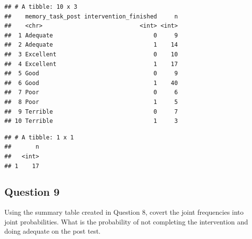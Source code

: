 \documentclass[]{book}
\newenvironment{Shaded}{\begin{snugshade}}{\end{snugshade}}
\newcommand{\CommentTok}[1]{\textcolor[rgb]{0.56,0.35,0.01}{\textit{#1}}}
\newcommand{\DecValTok}[1]{\textcolor[rgb]{0.00,0.00,0.81}{#1}}
\newcommand{\FloatTok}[1]{\textcolor[rgb]{0.00,0.00,0.81}{#1}}
\newcommand{\KeywordTok}[1]{\textcolor[rgb]{0.13,0.29,0.53}{\textbf{#1}}}
\newcommand{\NormalTok}[1]{#1}
\newcommand{\OperatorTok}[1]{\textcolor[rgb]{0.81,0.36,0.00}{\textbf{#1}}}
\newcommand{\StringTok}[1]{\textcolor[rgb]{0.31,0.60,0.02}{#1}}
\theoremstyle{definition}
\theoremstyle{definition}
\theoremstyle{definition}
\theoremstyle{remark}
\begin{document}
\begin{verbatim}
## # A tibble: 10 x 3
##    memory_task_post intervention_finished     n
##    <chr>                            <int> <int>
##  1 Adequate                             0     9
##  2 Adequate                             1    14
##  3 Excellent                            0    10
##  4 Excellent                            1    17
##  5 Good                                 0     9
##  6 Good                                 1    40
##  7 Poor                                 0     6
##  8 Poor                                 1     5
##  9 Terrible                             0     7
## 10 Terrible                             1     3
\end{verbatim}

\begin{Shaded}
\end{Shaded}

\begin{verbatim}
## # A tibble: 1 x 1
##       n
##   <int>
## 1    17
\end{verbatim}

\hypertarget{question-9-1}{%
\subsection{Question 9}\label{question-9-1}}

Using the summary table created in Question 8, covert the joint frequencies into joint probabilities. What is the probability of not completing the intervention and doing adequate on the post test.
\end{document}
